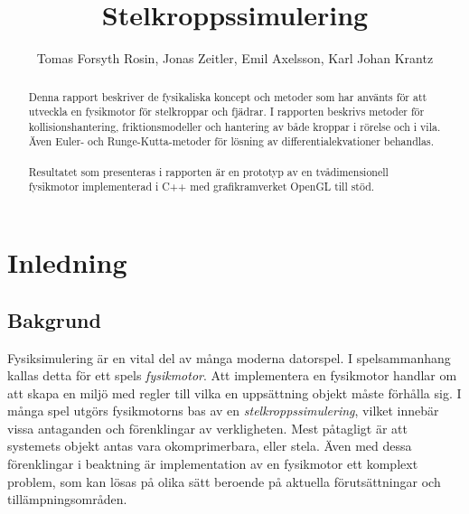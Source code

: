 \documentclass[a4paper,12pt,twopage,swedish]{article}
\begin{document}
\title{Stelkroppssimulering}
\author{Tomas Forsyth Rosin, Jonas Zeitler, Emil Axelsson, Karl Johan Krantz}
\begin{titlepage}
\maketitle
\thispagestyle{empty}
\end{titlepage}
\setcounter{page}{1}
\begin{abstract}
\noindent Denna rapport beskriver de fysikaliska koncept och metoder som har använts för att utveckla en fysikmotor för stelkroppar och fjädrar. I rapporten beskrivs metoder för kollisionshantering,  friktionsmodeller och hantering av både kroppar i rörelse och i vila. Även Euler- och Runge-Kutta-metoder för lösning av differentialekvationer behandlas. 
\\
\\Resultatet som presenteras i rapporten är en prototyp av en tvådimensionell fysikmotor implementerad i C++ med grafikramverket OpenGL till stöd.
\end{abstract}
\clearpage
\tableofcontents
\clearpage
\listoffigures
\clearpage
\setcounter{page}{1}

\section{Inledning}

\subsection{Bakgrund}
Fysiksimulering är en vital del av många moderna datorspel. I spelsammanhang kallas detta för ett spels \emph{fysikmotor}. Att implementera en fysikmotor handlar om att skapa en miljö med regler till vilka en uppsättning objekt måste förhålla sig. I många spel utgörs fysikmotorns bas av en \emph{stelkroppssimulering}, vilket innebär vissa antaganden och förenklingar av verkligheten. Mest påtagligt är att systemets objekt antas vara okomprimerbara, eller stela. Även med dessa förenklingar i beaktning är implementation av en fysikmotor ett komplext problem, som kan lösas på olika sätt beroende på aktuella förutsättningar och tillämpningsområden.
\end{document}
